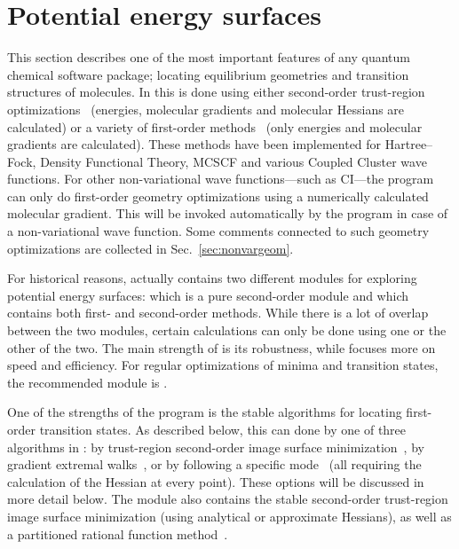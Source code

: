 \chapter{Potential energy surfaces}\label{ch:geometrywalks}

This section describes one of the most important features of any
quantum chemical software package; locating equilibrium
geometries and
transition structures of molecules. In
{\dalton} this is done using either second-order trust-region
optimizations~\cite{tuhjahjajpjjcp84} (energies, molecular gradients and
molecular Hessians are calculated)
or a variety of first-order
methods~\cite{Fletcher} (only energies and molecular gradients are
calculated). These methods
have been implemented for Hartree--Fock, Density Functional Theory,
MCSCF  and various Coupled Cluster wave functions. For other
non-variational wave functions---such as CI---the program can 
only do first-order geometry optimizations using a
numerically
calculated molecular gradient. This will be invoked automatically by the program
in case of a non-variational wave function. Some comments connected to
such geometry optimizations are collected in Sec.~\ref{sec:nonvargeom}.

For historical reasons, {\dalton} actually contains two different
modules for exploring potential energy surfaces:
 which is
a pure second-order module and  which contains both
first- and second-order methods. While there is a lot of overlap
between the two modules, certain calculations can only be done using
one or the other of the two. The main strength of  is its
robustness, while  focuses more on speed and
efficiency. For regular optimizations of minima and transition states,
the recommended module is .

One of the strengths of the {\dalton} program is the
stable algorithms for locating first-order transition states.
As described below, this can done by one of three algorithms in
: by trust-region second-order image surface
minimization~\cite{thcpl182},
by gradient extremal walks~\cite{pjhjajthtca73},
or by following a specific mode~\cite{hjajpjthjcp85} (all
requiring the calculation of the Hessian at every point). These
options will be discussed in more detail below. The 
module also contains the stable second-order trust-region image
surface minimization (using analytical or approximate Hessians), as
well as a partitioned rational function method~\cite{abnajsrsjpc89}.

